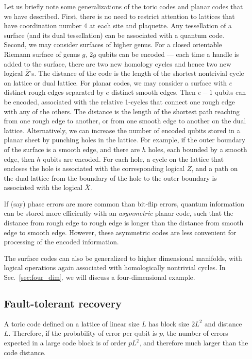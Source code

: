 Let us briefly note some generalizations of the toric codes and planar codes that we have described. First, there is no need to restrict attention to lattices that have coordination number 4 at each site and plaquette. Any tessellation of a surface (and its dual tessellation) can be associated with a quantum code. Second, we may consider surfaces of higher genus.  For a closed orientable Riemann surface of genus $g$, $2g$ qubits can be encoded --- each time a handle is added to the surface, there are two new homology cycles and hence two new logical $\bar Z$'s. The distance of the code is the length of the shortest nontrivial cycle on lattice or dual lattice. For planar codes, we may consider a surface with $e$ distinct rough edges separated by $e$ distinct smooth edges. Then $e-1$ qubits can be encoded, associated with the relative 1-cycles that connect one rough edge with any of the others. The distance is the length of the shortest path reaching from one rough edge to another, or from one smooth edge to another on the dual lattice. Alternatively, we can increase the number of encoded qubits stored in a planar sheet by punching holes in the lattice. For example, if the outer boundary of the surface is a smooth edge, and there are $h$ holes, each bounded by a smooth edge, then $h$ qubits are encoded. For each hole, a cycle on the lattice that encloses the hole is associated with the corresponding logical $\bar Z$, and a path on the dual lattice from the boundary of the hole to the outer boundary is associated with the logical $\bar X$.

If (say) phase errors are more common than bit-flip errors, quantum information can be stored more efficiently with an {\em asymmetric} planar code, such that the distance from rough edge to rough edge is longer than the distance from smooth edge to smooth edge. However, these asymmetric codes are less convenient for processing of the encoded information. 

The surface codes can also be generalized to higher dimensional manifolds, with logical operations again associated with homologically nontrivial cycles.  In Sec.~\ref{sec:four_dim}, we will discuss a four-dimensional example. 

\subsection{Fault-tolerant recovery}
\label{subsec:ftrec}
A toric code defined on a lattice of linear size $L$ has block size $2L^2$ and distance $L$. Therefore, if the probability of error per qubit is $p$, the number of errors expected in a large code block is of order $pL^2$, and therefore much larger than the code distance.

